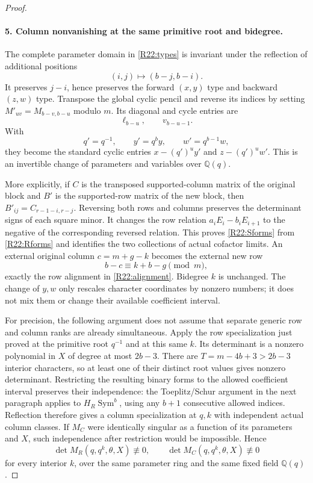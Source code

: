 \begin{proof}
\paragraph{5. Column nonvanishing at the same primitive root and bidegree.}
The complete parameter domain in \eqref{R22:types} is invariant under
the reflection of additional positions
\begin{equation}\label{R22:reflection}
 (i,j)\longmapsto(b-j,b-i).
\end{equation}
It preserves $j-i$, hence preserves the forward $(x,y)$ type and
backward $(z,w)$ type. Transpose the global cyclic pencil and reverse
its indices by setting $M'_{uv}=M_{b-v,b-u}$ modulo $m$.
Its diagonal and cycle entries are
\[
 \ell_{b-u},\qquad v_{b-u-1}.
\]
With
\[
 q'=q^{-1},\qquad y'=q^by,\qquad w'=q^{b-1}w,
\]
they become the standard cyclic entries $x-(q')^uy'$ and
$z-(q')^uw'$. This is an invertible change of parameters and variables
over $\mathbb Q(q)$.

More explicitly, if $C$ is the transposed supported-column matrix of
the original block and $B'$ is the supported-row matrix of the new
block, then $B'_{ij}=C_{r-1-i,r-j}$. Reversing both rows and columns
preserves the determinant signs of each square minor. It changes the
row relation $a_iE_i-b_iE_{i+1}$ to the negative of the corresponding
reversed relation. This proves \eqref{R22:Sforms} from
\eqref{R22:Rforms} and identifies the two collections of actual
cofactor limits. An external original column $c=m+g-k$ becomes the
external new row
\[
 b-c\equiv k+b-g\pmod m,
\]
exactly the row alignment in \eqref{R22:alignment}. Bidegree $k$ is
unchanged. The change of $y,w$ only rescales character coordinates by
nonzero numbers; it does not mix them or change their available
coefficient interval.

For precision, the following argument does not assume that separate
generic row and column ranks are already simultaneous. Apply the
row specialization just proved at the primitive root $q^{-1}$ and
at this same $k$. Its determinant is a nonzero polynomial in $X$
of degree at most $2b-3$. There are $T=m-4b+3>2b-3$ interior
characters, so at least one of their distinct root values gives
nonzero determinant. Restricting the resulting binary forms to the
allowed coefficient interval preserves their independence: the
Toeplitz/Schur argument in the next paragraph applies to
$H_R\operatorname{Sym}^b$, using any $b+1$ consecutive allowed
indices. Reflection therefore gives a column specialization at $q,k$
with independent actual column classes. If $M_C$ were identically
singular as a function of its parameters and $X$, such independence
after restriction would be impossible. Hence
\begin{equation}\label{R22:two_nonzero}
 \det M_R(q,q^k,\theta,X)\not\equiv0,
 \qquad
 \det M_C(q,q^k,\theta,X)\not\equiv0
\end{equation}
for every interior $k$, over the same parameter ring and the same
fixed field $\mathbb Q(q)$.


\end{proof}
